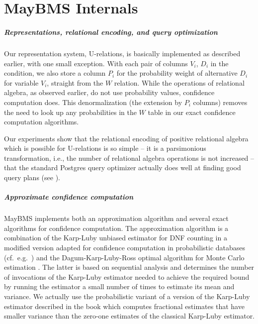 




\chapter{MayBMS Internals}
\label{sect:system}


\paragraph{Representations, relational encoding, and query optimization}
%
Our representation system, U-relations, is basically implemented as described earlier, with one small exception. With each pair of columns $V_i$, $D_i$ in the condition, we also store a column $P_i$ for the probability weight of alternative $D_i$ for variable $V_i$, straight from the $W$ relation. While the operations of relational algebra, as observed earlier, do not use probability values, confidence computation does. This denormalization (the extension by $P_i$ columns) removes the need to look up any probabilities in the $W$ table in our exact confidence computation algorithms.

Our experiments show that the relational encoding of positive relational algebra which is possible for U-relations is so simple -- it is a parsimonious transformation, i.e., the number of relational algebra operations is not increased -- that the standard Postgres query optimizer actually does well at finding good query plans (see \cite{AJKO2008}).


\paragraph{Approximate confidence computation}
%
MayBMS implements both an approximation algorithm and several exact algorithms for confidence computation. The approximation algorithm is a combination of the Karp-Luby unbiased estimator for DNF counting \cite{KL1983,KLM1989} in a modified version adapted for confidence computation in probabilistic databases (cf.\ e.g.\ \cite{Koch2008}) and the Dagum-Karp-Luby-Ross optimal algorithm for Monte Carlo estimation \cite{DKLR2000}. The latter is based on sequential analysis and determines the number of invocations of the Karp-Luby estimator needed to achieve the required bound by running the estimator a small number of times to estimate its mean and variance. We actually use the probabilistic variant of a version of the Karp-Luby estimator described in the book \cite{Vazirani2001} which computes fractional estimates that have smaller variance than the zero-one estimates of the classical Karp-Luby estimator.


